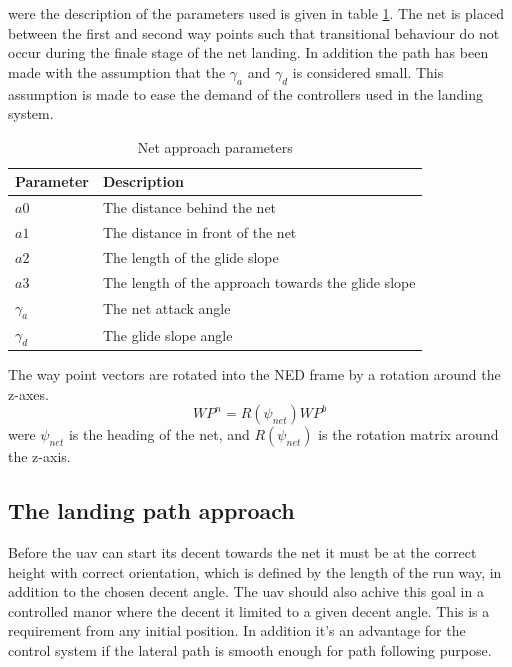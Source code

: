 were the description of the parameters used is given in table \ref{Tb:Approach Parameters}. The net is placed between the first and second way points such that transitional behaviour do not occur during the finale stage of the net landing. In addition the path has been made with the assumption that the $\gamma_a$ and $\gamma_d$ is considered small. This assumption is made to ease the demand of the controllers used in the landing system.
\begin{table}[H]
\begin{center}
    \begin{tabular}{ | l | l |}
    \hline
    \textbf{Parameter} & \textbf{Description} \\ \hline
    $a0$ & The distance behind the net \\ \hline
    $a1$ & The distance in front of the net \\ \hline
    $a2$ & The length of the glide slope \\ \hline
    $a3$ & The length of the approach towards the glide slope \\ \hline
    $\gamma_a$ & The net attack angle \\ \hline
    $\gamma_d$ & The glide slope angle \\ \hline
    \end{tabular}
\end{center}
\caption{Net approach parameters }
\label{Tb:Approach Parameters}
\end{table}
The way point vectors are rotated into the NED frame by a rotation around the z-axes.
\begin{equation}
WP^n = R(\psi_{net})WP^b
\end{equation}
were $\psi_{net}$ is the heading of the net, and $R(\psi_{net})$ is the rotation matrix around the z-axis.
\begin{figure}\label{Fig:LandingPhase}
\def\svgwidth{\textwidth} %

\end{figure}

\subsection{The landing path approach}\label{SS:LandingApproach}
Before the \gls{uav} can start its decent towards the net it must be at the correct height with correct orientation, which is defined by the length of the run way, in addition to the chosen decent angle. The \gls{uav} should also achive this goal in a controlled manor where the decent it limited to a given decent angle. This is a requirement from any initial position. In addition it's an advantage for the control system if the lateral path is smooth enough for path following purpose.

